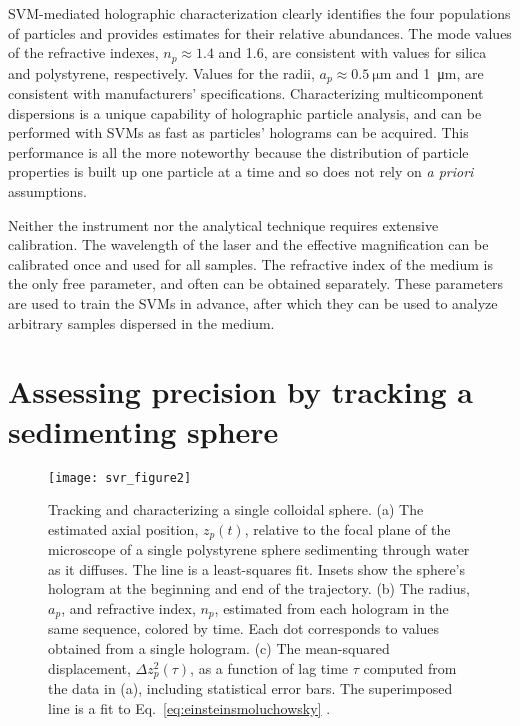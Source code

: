 SVM-mediated holographic characterization clearly identifies
the four populations of particles and provides estimates for their relative abundances.
The mode values of the refractive indexes, $n_p \approx \num{1.4}$ 
and \num{1.6}, are consistent with values for silica and polystyrene,
respectively.  Values for the radii, $a_p \approx \SI{0.5}{\um}$
and \SI{1}{\um}, are consistent with manufacturers'
specifications.
Characterizing multicomponent dispersions
is a unique capability of holographic particle analysis, and
can be performed with SVMs as fast as 
particles' holograms can be acquired.
This performance is all the more noteworthy because the
distribution of particle properties is built up one particle at a time
and so does not rely on \emph{a priori} assumptions.

Neither the instrument nor the analytical technique requires
extensive calibration.
The wavelength of the laser and the effective magnification can be
calibrated once and used for all samples.
The refractive index of the medium is the only free parameter, 
and often can be obtained separately.
These parameters are used to train the SVMs in advance,
after which they can be used to analyze arbitrary samples
dispersed in the medium.

\section{Assessing precision by tracking a sedimenting sphere}

\begin{figure}
  \centering
  \texttt{[image: svr\_figure2]}
  \caption{Tracking and characterizing a single colloidal sphere.
    (a) The estimated axial position, $z_p(t)$, relative to the focal plane
    of the microscope of a single polystyrene sphere sedimenting
    through water as it diffuses.  The line is a least-squares fit.
    Insets show the sphere's hologram at the beginning and end
    of the trajectory.
    (b) The radius, $a_p$, and refractive index, $n_p$,
    estimated from each hologram in the same sequence, colored
    by time.  Each dot corresponds to values obtained from a single
    hologram.
    (c) The mean-squared displacement, $\Delta z_p^2(\tau)$, as a function
    of lag time $\tau$ computed from the data in (a), including
    statistical error bars.  The superimposed line is a fit to
    Eq.~\eqref{eq:einsteinsmoluchowsky} \cite{yevick14}.}
  \label{fig:values}
\end{figure}

